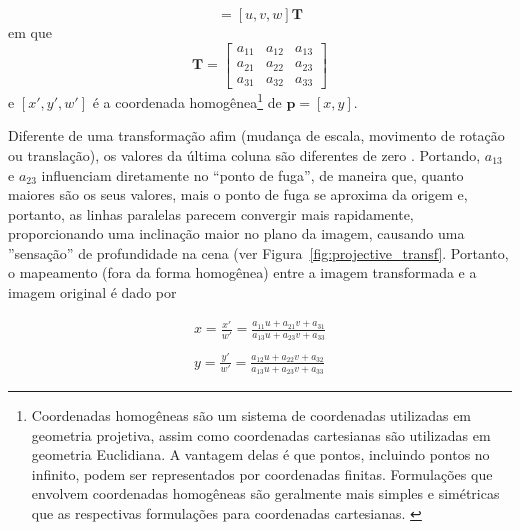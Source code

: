 \begin{equation}
    [x',y',w'] = [u, v, w]  \mathbf{T}
    \label{equacao:matriz_transform}
\end{equation}
em que
\begin{equation}
    \mathbf{T} = 
    \begin{bmatrix}
    a_{11} &  a_{12} & a_{13} \\
    a_{21} &  a_{22} & a_{23} \\
    a_{31} &  a_{32} & a_{33}
    \end{bmatrix}
    \nonumber
\end{equation}
e $[x',y',w']$ é a coordenada homogênea\footnote{Coordenadas homogêneas são um sistema de coordenadas utilizadas em geometria projetiva, assim como coordenadas cartesianas são utilizadas em geometria Euclidiana. A vantagem delas é que pontos, incluindo pontos no infinito, podem ser representados por coordenadas finitas. Formulações que envolvem coordenadas homogêneas são geralmente mais simples e simétricas que as respectivas formulações para coordenadas cartesianas. \cite{August:1997}} de $\mathbf{p} = [x ,y]$.

Diferente de uma transformação afim (mudança de escala, movimento de rotação ou translação), os valores da última coluna são diferentes de zero \cite{Wolberg:1990}. Portando, $a_{13}$ e $a_{23}$ influenciam diretamente no ``ponto de fuga'', de maneira que, quanto maiores são os seus valores, mais o ponto de fuga se aproxima da origem e, portanto, as linhas paralelas parecem convergir mais rapidamente, proporcionando uma inclinação maior no plano da imagem, causando uma ''sensação'' de profundidade na cena (ver Figura~\ref{fig:projective_transf}. Portanto, o mapeamento (fora da forma homogênea) entre a imagem transformada e a imagem original é dado por
 
 \begin{equation}
    \begin{array}{l}
        x = \frac{x'}{w'} = \frac{a_{11}u + a_{21}v+ a_{31}}{a_{13}u + a_{23}v+ a_{33}} \\
        \\
        y = \frac{y'}{w'} = \frac{a_{12}u + a_{22}v+ a_{32}}{a_{13}u + a_{23}v+ a_{33}}
    \end{array}
    \label{equacao:map_transform}
\end{equation}

